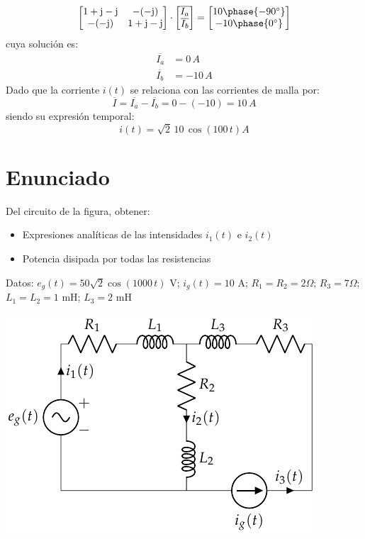\begin{equation*}
  \begin{bmatrix}
    1+\mathrm{j}-\mathrm{j} & -(-\mathrm{j})\\
    -(-\mathrm{j}) & 1+\mathrm{j}-\mathrm{j}
  \end{bmatrix}
  \cdot
  \begin{bmatrix}
    \overline{I_a}\\
    \overline{I_b}
  \end{bmatrix}
  =
  \begin{bmatrix}
    10\phase{-90^\circ}\\
    -10\phase{0^\circ}
  \end{bmatrix}
\end{equation*}
cuya solución es:
\begin{align*}
  \overline{I_a}&=0\,A\\
  \overline{I_b}&=-10\,A
\end{align*}
Dado que la corriente $i(t)$ se relaciona con las corrientes de malla
por:
\begin{equation*}
  \overline{I}=\overline{I_a}-\overline{I_b}=0-(-10)=10\,A
\end{equation*}
siendo su expresión temporal:
\begin{equation*}
  i(t)=\sqrt{2}\,10\,\cos(100\,t) A
\end{equation*}



\section{Enunciado}
Del circuito de la figura, obtener:
\begin{itemize}
\item Expresiones analíticas de las intensidades $i_1(t)$ e $i_2(t)$
\item Potencia disipada por todas las resistencias
\end{itemize}
Datos: $e_g(t)=50\sqrt{2} \cos(1000\,t)$ V; $i_g(t)=10$ A;
$R_1=R_2=2\Omega$; $R_3=7\Omega$; $L_1=L_2=1$ mH; $L_3=2$ mH

\begin{center}
  \includegraphics{figuras/BT2_18.pdf}
\end{center}


